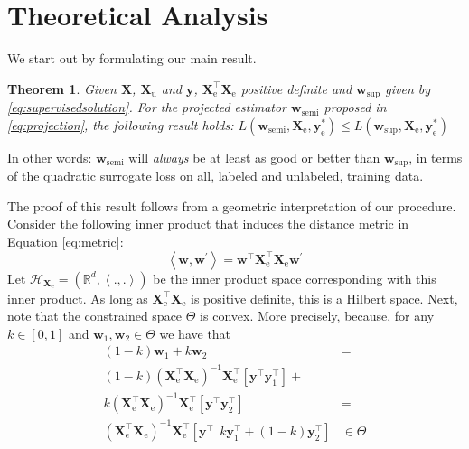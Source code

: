 \documentclass{article}
\newcommand{\Xe}{\vec{X}_\mathrm{e}  }
\newcommand{\XeT}{\vec{X}_\mathrm{e}^\top}
\newcommand{\G}{\left(\Xe^\top \Xe \right)^{-1}}
\newtheorem{theorem}{Theorem}
\renewcommand{\vec}[1]{\mathbf{#1}}
\begin{document}
\section{Theoretical Analysis}
\label{section:theory}

We start out by formulating our main result.
\begin{theorem}
\label{th:robustness}
Given $\vec{X}$, $\vec{X}_\mathrm{u}$ and $\vec{y}$, $\Xe^\top \Xe$ positive definite and $\vec{w}_\mathrm{sup}$ given by \eqref{eq:supervisedsolution}. For the projected estimator $\vec{w}_\mathrm{semi}$ proposed in \eqref{eq:projection}, the following result holds:
$L(\vec{w}_\mathrm{semi},\Xe,\vec{y}_\mathrm{e}^{\ast}) \leq L(\vec{w}_\mathrm{sup},\Xe,\vec{y}_\mathrm{e}^{\ast}) $
\end{theorem}
In other words: $\vec{w}_\text{semi}$ will \emph{always} be at least as good or better than $\vec{w}_\text{sup}$, in terms of the quadratic surrogate loss on all, labeled and unlabeled, training data.

The proof of this result follows from a geometric interpretation of our procedure. Consider the following inner product that induces the distance metric in Equation \eqref{eq:metric}:
\begin{equation}
\left\langle \vec{w}, \vec{w}^\prime \right\rangle = \vec{w}^\top \vec{X}_\text{e}^\top \vec{X}_\text{e} \vec{w}^\prime
\end{equation}
Let $\mathcal{H}_{\vec{X}_\text{e}} = ( \mathbb{R}^d,\left\langle ., . \right\rangle )$ be the inner product space corresponding with this inner product. As long as $\XeT \Xe$ is positive definite, this is a Hilbert space. Next, note that the constrained space $\Theta$ is convex. More precisely, because, for any $k \in [0,1]$ and $\vec{w}_\text{1},\vec{w}_\text{2} \in \Theta$ we have that
\begin{align}
(1-k) \vec{w}_\text{1} + k \vec{w}_\text{2} & = \nonumber \\
(1-k) \G \XeT \left[\vec{y}^\top \vec{y}_\text{1}^\top \right] + & \nonumber \\ 
 k \G \XeT \left[\vec{y}^\top \vec{y}_\text{2}^\top \right] & = \nonumber \\ 
\G \XeT \left[\vec{y}^\top ~~ k \vec{y}_\text{1}^\top + (1-k) \vec{y}_\text{2}^\top \right] & \in \Theta \nonumber
\end{align}
\end{document}
